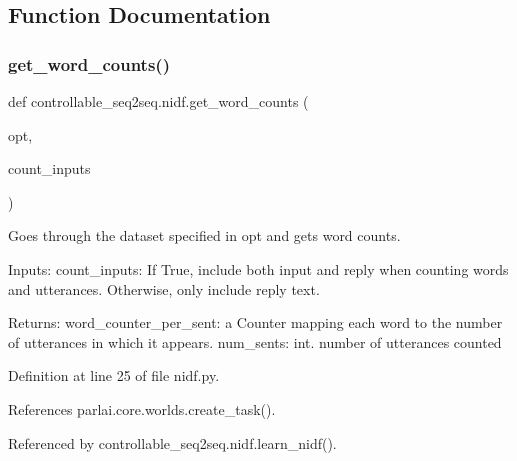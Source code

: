 \subsection{Function Documentation}
\mbox{\label{namespacecontrollable__seq2seq_1_1nidf_a37a19098963f0cd702448fb479fbe37d}} 
\subsubsection{\texorpdfstring{get\+\_\+word\+\_\+counts()}{get\_word\_counts()}}
{\footnotesize\ttfamily def controllable\+\_\+seq2seq.\+nidf.\+get\+\_\+word\+\_\+counts (\begin{DoxyParamCaption}\item[{}]{opt,  }\item[{}]{count\+\_\+inputs }\end{DoxyParamCaption})}

\begin{DoxyVerb}Goes through the dataset specified in opt and gets word counts.

Inputs:
  count_inputs: If True, include both input and reply when counting words
    and utterances. Otherwise, only include reply text.

Returns:
  word_counter_per_sent: a Counter mapping each word to the number of
    utterances in which it appears.
  num_sents: int. number of utterances counted
\end{DoxyVerb}
 

Definition at line 25 of file nidf.\+py.



References parlai.\+core.\+worlds.\+create\+\_\+task().



Referenced by controllable\+\_\+seq2seq.\+nidf.\+learn\+\_\+nidf().

